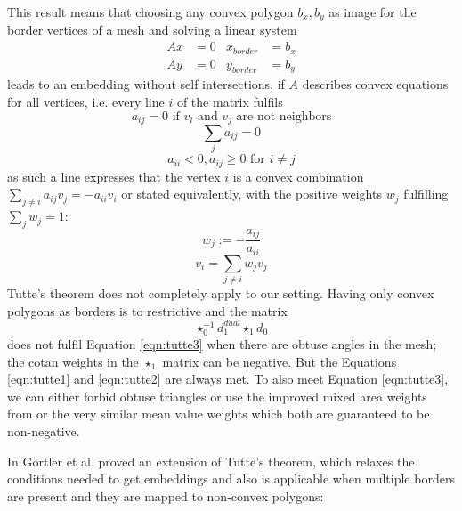 This result means that choosing any convex polygon $b_x, b_y$ as image for the border vertices of a mesh and solving a linear system
\begin{align*}Ax &= 0 & x_{border} &= b_x\\
Ay &= 0 &y_{border} &= b_y\end{align*}
leads to an embedding without self intersections, if $A$ describes convex equations for all vertices, i.e. every line $i$ of the matrix fulfils
\begin{equation}
a_{ij} = 0 \text{ if $v_i$ and $v_j$ are not neighbors} \label{eqn:tutte1}
\end{equation}
\begin{equation}\sum_{j} a_{ij} = 0\label{eqn:tutte2}
\end{equation}
\begin{equation}
a_{ii} <0, a_{ij} \geq 0 \text{ for $i\neq j$}\label{eqn:tutte3}
\end{equation}
as such a line expresses that the vertex $i$ is a convex combination $\sum_{j\neq i} a_{ij} v_j = -a_{ii}v_i$ or stated equivalently, with the positive weights $w_j$ fulfilling $\sum_{j} w_j = 1$:
\[w_j := -\frac{a_{ij}}{a_{ii}}\]
\[v_i = \sum_{j \neq i} w_j v_j\]
Tutte's theorem does not completely apply to our setting. Having only convex polygons as borders is to restrictive and the matrix
\[\star_0^{-1} d_1^{dual} \star_1 d_0\]
does not fulfil Equation \ref{eqn:tutte3} when there are obtuse angles in the mesh; the cotan weights in the $\star_1$ matrix can be negative. But the Equations \ref{eqn:tutte1} and \ref{eqn:tutte2} are always met. 
To also meet Equation \ref{eqn:tutte3}, we can either forbid obtuse triangles or use the improved mixed area weights from \cite{laplacebeltrami} or the very similar mean value weights \cite{Floater200319} which both are guaranteed to be non-negative.

In \cite{Gortler} Gortler et al. proved an extension of Tutte's theorem, which relaxes the conditions needed to get embeddings and also is applicable when multiple borders are present and they are mapped to non-convex polygons:

